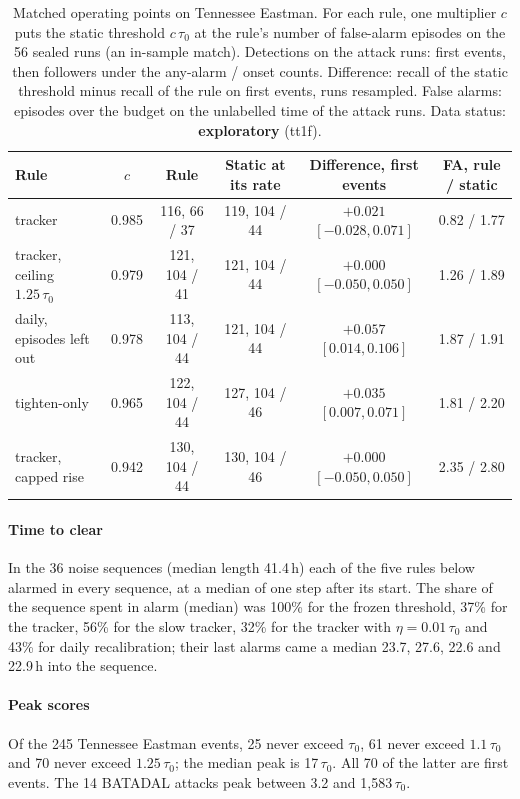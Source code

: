 \documentclass[sigconf]{acmart}
\begin{document}
\begin{table}[t]
\caption{Matched operating points on Tennessee Eastman. For each rule, one multiplier $c$ puts the static
threshold $c\,\tau_0$ at the rule's number of false-alarm episodes on the 56 sealed runs (an in-sample
match). Detections on the attack runs: first events, then followers under the any-alarm / onset counts.
Difference: recall of the static threshold minus recall of the rule on first events, runs resampled.
False alarms: episodes over the budget on the unlabelled time of the attack runs. Data status:
\textbf{exploratory} (tt1f).}
\label{tab:matched}
\small
\begin{tabularx}{\textwidth}{@{}Lccccc@{}}
\toprule
Rule & $c$ & Rule & Static at its rate & Difference, first events & FA, rule / static \\
\midrule
tracker & 0.985 & 116, 66 / 37 & 119, 104 / 44 & $+0.021$ $[-0.028, 0.071]$ & 0.82 / 1.77 \\
tracker, ceiling $1.25\,\tau_0$ & 0.979 & 121, 104 / 41 & 121, 104 / 44 & $+0.000$ $[-0.050, 0.050]$ & 1.26 / 1.89 \\
daily, episodes left out & 0.978 & 113, 104 / 44 & 121, 104 / 44 & $+0.057$ $[0.014, 0.106]$ & 1.87 / 1.91 \\
tighten-only & 0.965 & 122, 104 / 44 & 127, 104 / 46 & $+0.035$ $[0.007, 0.071]$ & 1.81 / 2.20 \\
tracker, capped rise & 0.942 & 130, 104 / 44 & 130, 104 / 46 & $+0.000$ $[-0.050, 0.050]$ & 2.35 / 2.80 \\
\bottomrule
\end{tabularx}
\end{table}

\paragraph{Time to clear}
In the 36 noise sequences (median length 41.4\,h) each of the five rules below alarmed in every sequence, at a median of one step
after its start. The share
of the sequence spent in alarm (median) was 100\% for the frozen threshold, 37\% for the tracker, 56\% for
the slow tracker, 32\% for the tracker with $\eta = 0.01\,\tau_0$ and 43\% for daily recalibration; their last
alarms came a median 23.7, 27.6, 22.6 and 22.9\,h into the sequence.

\paragraph{Peak scores}
Of the 245 Tennessee Eastman events, 25 never exceed $\tau_0$, 61 never exceed $1.1\,\tau_0$ and 70 never exceed
$1.25\,\tau_0$; the median peak is 17\,$\tau_0$. All 70 of the latter are first events. The
14 BATADAL attacks peak between 3.2 and 1,583\,$\tau_0$.
\end{document}
